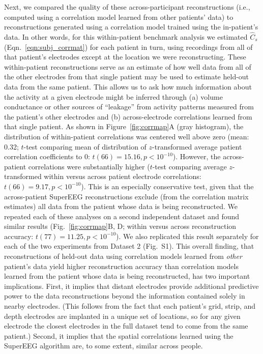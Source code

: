 \documentclass[11pt]{article}
\newcommand{\perexpcorrmaps}{S1}
\begin{document}
Next, we compared the quality of these across-participant reconstructions (i.e.,
computed using a correlation model learned from other patients' data) to
reconstructions generated using a correlation model trained using the
in-patient's data.  In other words, for this within-patient benchmark analysis
we estimated $\hat{C}_{s}$ (Eqn.~\ref{eqn:subj_corrmat}) for each patient in
turn, using recordings from all of that patient's electrodes except at the
location we were reconstructing.  These within-patient reconstructions serve as
an estimate of how well data from all of the other electrodes from that single
patient may be used to estimate held-out data from the same patient.  This
allows us to ask how much information about the activity at a given electrode
might be inferred through (a) volume conductance or other sources of ``leakage''
from activity patterns measured from the patient's other electrodes and (b)
across-electrode correlations learned from that single patient.  As shown in
Figure~\ref{fig:corrmap}A (gray histogram), the distribution of within-patient
correlations was centered well above zero (mean: 0.32; $t$-test comparing mean
of distribution of $z$-transformed average patient correlation coefficients to
0: $t(66) = 15.16, p < 10^{-10}$). However, the across-patient correlations were
substantially higher ($t$-test comparing average $z$-transformed within versus
across patient electrode correlations: $t(66) = 9.17, p < 10^{-10}$).  This is
an especially conservative test, given that the across-patient SuperEEG
reconstructions exclude (from the correlation matrix estimates) all data from
the patient whose data is being reconstructed.  We repeated each of these
analyses on a second independent dataset and found similar results
(Fig.~\ref{fig:corrmap}B, D; within versus across reconstruction accuracy:
$t(77) = 11.25, p < 10^{-10}$). We also replicated this result separately for
each of the two experiments from Dataset 2 (Fig.~\perexpcorrmaps).  This overall
finding, that reconstructions of held-out data using correlation models learned
from \textit{other} patient's data yield higher reconstruction accuracy than
correlation models learned from the patient whose data is being reconstructed,
has two important implications.  First, it implies that distant electrodes
provide additional predictive power to the data reconstructions beyond the
information contained solely in nearby electrodes.  (This follows from the fact
that each patient's grid, strip, and depth electrodes are implanted in a unique
set of locations, so for any given electrode the closest electrodes in the full
dataset tend to come from the same patient.)  Second, it implies that the
spatial correlations learned using the SuperEEG algorithm are, to some extent,
similar across people.
\end{document}
